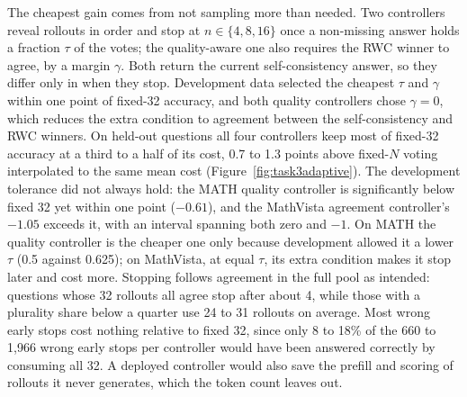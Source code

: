 The cheapest gain comes from not sampling more than needed. Two controllers reveal rollouts in order and stop at $n\in\{4,8,16\}$ once a non-missing answer holds a fraction $\tau$ of the votes; the quality-aware one also requires the RWC winner to agree, by a margin $\gamma$. Both return the current self-consistency answer, so they differ only in when they stop. Development data selected the cheapest $\tau$ and $\gamma$ within one point of fixed-32 accuracy, and both quality controllers chose $\gamma=0$, which reduces the extra condition to agreement between the self-consistency and RWC winners. On held-out questions all four controllers keep most of fixed-32 accuracy at a third to a half of its cost, 0.7 to 1.3 points above fixed-$N$ voting interpolated to the same mean cost (Figure~\ref{fig:task3adaptive}). The development tolerance did not always hold: the MATH quality controller is significantly below fixed 32 yet within one point ($-0.61$), and the MathVista agreement controller's $-1.05$ exceeds it, with an interval spanning both zero and $-1$. On MATH the quality controller is the cheaper one only because development allowed it a lower $\tau$ (0.5 against 0.625); on MathVista, at equal $\tau$, its extra condition makes it stop later and cost more. Stopping follows agreement in the full pool as intended: questions whose 32 rollouts all agree stop after about 4, while those with a plurality share below a quarter use 24 to 31 rollouts on average. Most wrong early stops cost nothing relative to fixed 32, since only 8 to 18\% of the 660 to 1,966 wrong early stops per controller would have been answered correctly by consuming all 32. A deployed controller would also save the prefill and scoring of rollouts it never generates, which the token count leaves out.
